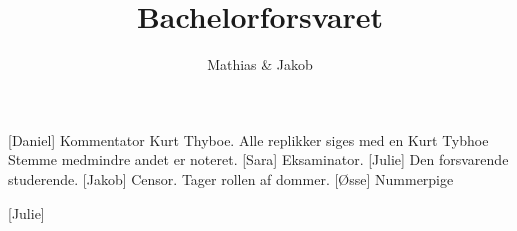\documentclass[a4paper,11pt]{article}
\title{Bachelorforsvaret}
\author{Mathias \& Jakob }
\begin{document}
\maketitle

\begin{roles}
[Daniel] Kommentator Kurt Thyboe. Alle replikker siges med en Kurt Tybhoe Stemme medmindre andet er noteret.
[Sara] Eksaminator.
[Julie] Den forsvarende studerende.
[Jakob] Censor. Tager rollen af dommer.
[Øsse] Nummerpige
\end{roles}

\begin{props}
[Julie]
\end{props}
\end{document}
